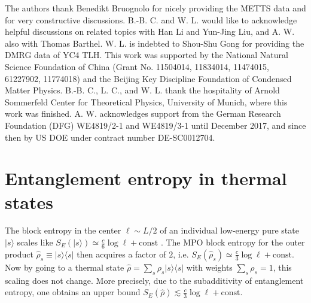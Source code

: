 \documentclass[aps,prx,twocolumn,showpacs,psfig,superscriptaddress,longbibliography]{revtex4-1}
\begin{document}
\begin{acknowledgments}

The authors thank Benedikt Bruognolo
for nicely providing the METTS data and for very constructive
discussions. B.-B. C. and W. L. would like to acknowledge helpful
discussions on related topics with Han Li and Yun-Jing Liu, and
A. W. also with Thomas Barthel.  {W. L. is indebted to Shou-Shu Gong for providing the DMRG data of YC4 TLH.} 
This work was supported by the
National Natural Science Foundation of China (Grant No. 11504014,  {11834014,} 
11474015, 61227902, 11774018) and the Beijing Key Discipline
Foundation of Condensed Matter Physics.  B.-B. C., L. C., and W. L. thank the
hospitality of Arnold Sommerfeld Center for Theoretical Physics,
University of Munich, where this work was finished.  A. W.
acknowledges support from the German Research Foundation (DFG)
WE4819/2-1 and  WE4819/3-1 until December 2017, and since 
then by US DOE under contract number DE-SC0012704.

\end{acknowledgments}

\appendix

\setcounter{figure}{0}    
\renewcommand\thefigure{A.\arabic{figure}}


\section{Entanglement entropy in thermal states}
\label{App:SE}

The block entropy in the center $\ell \sim L/2$ of an individual
low-energy pure state $|s\rangle$ scales like $S_E(|s\rangle) \simeq
\tfrac{c}{6} \log \ell + \mathrm{const}$ \cite{Calabrese09,Amico08}.
The MPO block entropy for the outer product $\hat{\rho}_s \equiv
|s\rangle \langle s|$ then acquires a factor of $2$, i.e.
$S_E(\hat{\rho}_s) \simeq \tfrac{c}{3} \log \ell + \mathrm{const}$.
%
Now by going to a thermal state $\hat{\rho} = \sum_s \rho_s |s
\rangle\langle s|$ with weights $\sum_s \rho_s=1$, this scaling
does not change.  More precisely, due to the subadditivity of
entanglement entropy, one obtains an upper bound $S_E(\hat{\rho})
\lesssim \tfrac{c}{3} \log \ell + \mathrm{const}$.  
\end{document}
